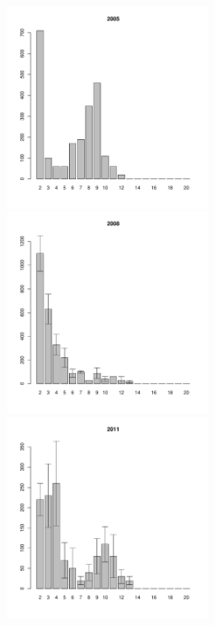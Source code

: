 \begin{figure}[hp]
\begin{minipage}[b]{.3\linewidth}
\begin{center}
	\end{center}
	\end{minipage}
	\begin{minipage}[b]{.3\linewidth}
	\begin{center}
	\includegraphics[width=60mm]{../White_Sea/Luvenga_Goreliy/middle2_2005_.pdf}
	\end{center}
	\end{minipage}
	\hfill	
	\begin{minipage}[b]{.3\linewidth}
	\begin{center}
	\includegraphics[width=60mm]{../White_Sea/Luvenga_Goreliy/middle2_2008_.pdf}
	\end{center}
	\end{minipage}
	\hfill
	\begin{minipage}[b]{.3\linewidth}
	\begin{center}
	\includegraphics[width=60mm]{../White_Sea/Luvenga_Goreliy/middle2_2011_.pdf}

\end{center}
\end{minipage}
\end{figure}
